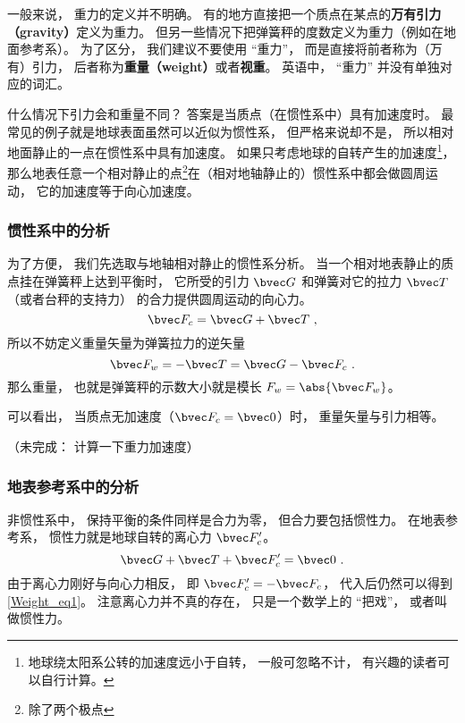 

一般来说， 重力的定义并不明确。 有的地方直接把一个质点在某点的\textbf{万有引力（gravity）}定义为重力。 但另一些情况下把弹簧秤的度数定义为重力（例如在地面参考系）。 为了区分， 我们建议不要使用 “重力”， 而是直接将前者称为（万有）引力， 后者称为\textbf{重量（weight）}或者\textbf{视重}。 英语中， “重力” 并没有单独对应的词汇。

什么情况下引力会和重量不同？ 答案是当质点（在惯性系中）具有加速度时。 最常见的例子就是地球表面虽然可以近似为惯性系， 但严格来说却不是， 所以相对地面静止的一点在惯性系中具有加速度。 如果只考虑地球的自转产生的加速度\footnote{地球绕太阳系公转的加速度远小于自转， 一般可忽略不计， 有兴趣的读者可以自行计算。}， 那么地表任意一个相对静止的点\footnote{除了两个极点}在（相对地轴静止的）惯性系中都会做圆周运动， 它的加速度等于向心加速度。

\subsubsection{惯性系中的分析}
为了方便， 我们先选取与地轴相对静止的惯性系分析。 当一个相对地表静止的质点挂在弹簧秤上达到平衡时， 它所受的引力 $\bvec G$ 和弹簧对它的拉力 $\bvec T$（或者台秤的支持力） 的合力提供圆周运动的向心力。
\begin{equation}\label{Weight_eq1}
\bvec F_c = \bvec G + \bvec T~,
\end{equation}
所以不妨定义重量矢量为弹簧拉力的逆矢量
\begin{equation}
\bvec F_w = -\bvec T = \bvec G - \bvec F_c~.
\end{equation}
那么重量， 也就是弹簧秤的示数大小就是模长 $F_w = \abs{\bvec F_w}$。

可以看出， 当质点无加速度（$\bvec F_c = \bvec 0$）时， 重量矢量与引力相等。

（未完成： 计算一下重力加速度）

\subsubsection{地表参考系中的分析}
非惯性系中， 保持平衡的条件同样是合力为零， 但合力要包括惯性力。 在地表参考系， 惯性力就是地球自转的离心力 $\bvec F'_c$。
\begin{equation}
\bvec G + \bvec T + \bvec F'_c = \bvec 0~.
\end{equation}
由于离心力刚好与向心力相反， 即 $\bvec F'_c = -\bvec F_c$， 代入后仍然可以得到\autoref{Weight_eq1}。 注意离心力并不真的存在， 只是一个数学上的 “把戏”， 或者叫做惯性力。
